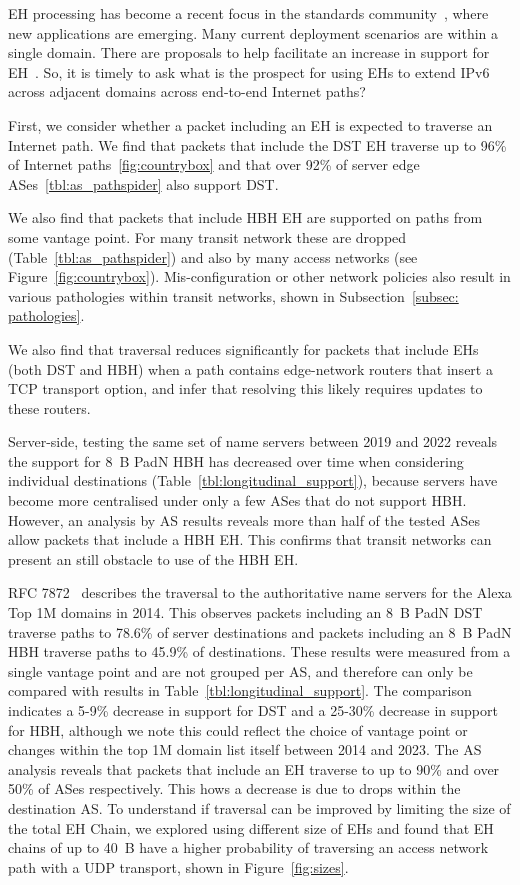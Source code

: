 \documentclass[conference]{IEEEtran}
\begin{document}
EH processing has become a recent focus in the standards community~\cite {ietf-v6ops-hbh-03}, where new applications are emerging. Many current deployment scenarios are within a single domain. There are proposals to help facilitate an increase in support for EH~\cite{ietf-6man-HBH-processing-06, ietf-6man-eh-limits-02}. 
So, it is timely to ask what is the prospect for using EHs to extend IPv6 across adjacent domains across end-to-end Internet paths?

First, we consider whether a packet including an EH is expected to traverse an Internet path.
We find that packets that include the DST EH traverse up to 96\% of Internet paths~\ref{fig:countrybox} and that over 92\% of server edge ASes~\ref{tbl:as_pathspider} also support DST.


We also find that packets that include HBH EH are supported on paths from some vantage point. For many transit network these are dropped  (Table~\ref{tbl:as_pathspider}) and also by many access networks (see Figure~\ref{fig:countrybox}). Mis-configuration or other network policies also result in various pathologies within transit networks, shown in Subsection~\ref{subsec: pathologies}. 

We also find that traversal reduces significantly for packets that include EHs (both DST and HBH) when a path contains edge-network routers that insert a TCP transport option, and infer that resolving this likely requires updates to these routers.

Server-side, testing the same set of name servers between 2019 and 2022 reveals the support for 8~B PadN HBH has decreased over time when considering individual destinations (Table~\ref{tbl:longitudinal_support}), because servers have become more centralised under only a few ASes that do not support HBH.  However, an analysis by AS results reveals more than half of the tested ASes allow packets that include a HBH EH. This confirms that transit networks can present an still obstacle to use of the HBH EH.

RFC 7872~\cite{RFC7872} describes the traversal to the authoritative name servers for the Alexa Top 1M domains in 2014. This observes packets including an 8~B PadN DST traverse paths to 78.6\% of server destinations and packets including an 8~B PadN HBH traverse paths to 45.9\% of destinations. These results were measured from a single vantage point and are not grouped per AS, and therefore can only be compared with results in Table~\ref{tbl:longitudinal_support}. The comparison indicates a 5-9\% decrease in support for DST and a 25-30\% decrease in support for HBH, although we note this could reflect the choice of vantage point or changes within the top 1M domain list itself between 2014 and 2023.
The AS analysis reveals that packets that include an EH traverse to up to 90\% and over 50\% of ASes respectively. This hows a decrease is due to drops within the destination AS.
To understand if traversal can be improved by limiting the size of the total EH Chain, we explored using different size of EHs and found that EH chains of up to 40~B have a higher probability of traversing an access network path with a UDP transport, shown in Figure~\ref{fig:sizes}.
\end{document}
